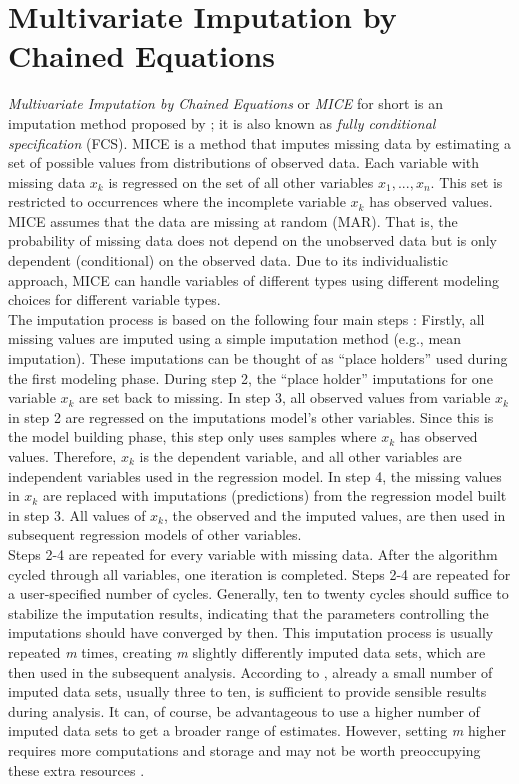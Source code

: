 \section{Multivariate Imputation by Chained Equations}
\textit{Multivariate Imputation by Chained Equations} or \textit{MICE} for 
short is an imputation method proposed by \citeauthor{RN135} \cite{RN135}; it 
is also known as \textit{fully conditional specification} (FCS).
MICE is a method that imputes missing data by estimating a set of possible 
values from distributions of observed data. Each variable with missing data 
$x_k$ is regressed on the set of all other variables $x_1,..., x_n$. This set 
is restricted to occurrences where the incomplete variable $x_k$ has 
observed values.
MICE assumes that the data are missing at random (MAR). That is, the 
probability 
of missing data does not depend on the unobserved data but is only 
dependent (conditional) on the observed data. Due to its individualistic 
approach, MICE can handle variables of different types using different 
modeling choices for different variable types.
\\
The imputation process is based on the following four main steps \cite{RN142, 
RN141}: Firstly, all missing values are imputed using a simple imputation 
method (e.g., mean imputation). These imputations can be thought of as ``place 
holders'' used during the first modeling phase. During step 2, the ``place 
holder'' imputations for one variable $x_k$ are set back to missing. In 
step 3, all observed values from variable $x_k$ in step 2 are regressed on 
the imputations model's other variables. Since this is the model building 
phase, this step only uses samples where $x_k$ has observed values. 
Therefore, $x_k$ is the dependent variable, and all other variables are 
independent variables used in the regression model. In step 4, the missing 
values in $x_k$ are replaced with imputations (predictions) from the 
regression model built in step 3. All values of $x_k$, the observed and the 
imputed values, are then used in subsequent regression models of other 
variables.
\\
Steps 2-4 are repeated for every variable with missing data. After the 
algorithm cycled through all variables, one iteration is 
completed. Steps 2-4 are repeated for a user-specified number of cycles. 
Generally, ten to twenty cycles should suffice to stabilize the imputation 
results, indicating that the parameters controlling the imputations should have 
converged by then. This imputation process is usually repeated \textit{m} 
times, creating \textit{m} slightly differently imputed data sets, which are 
then used in the subsequent analysis. According to \cite{RN144, RN141, RN142}, 
already a 
small number of imputed data sets, usually three to ten, is sufficient to 
provide sensible results during analysis. It can, of course, be advantageous 
to use a higher number of imputed data sets to get a broader range of 
estimates. However, setting \textit{m} higher requires more computations and 
storage 
and may not be worth preoccupying these extra resources \cite{RN144}.

